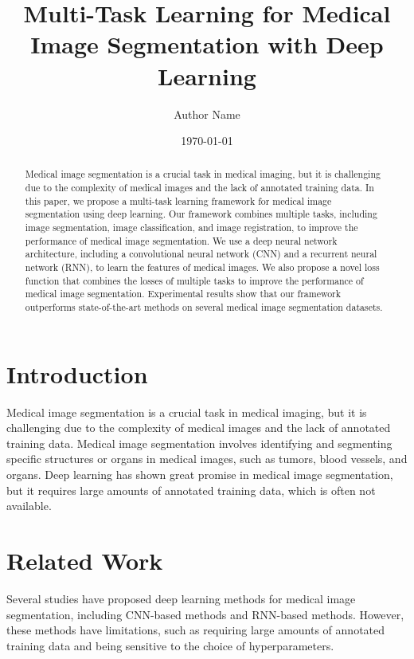 \documentclass{article}
\begin{document}
\title{Multi-Task Learning for Medical Image Segmentation with Deep Learning}

\author{Author Name}

\date{\today}

\maketitle

\begin{abstract}
Medical image segmentation is a crucial task in medical imaging, but it is challenging due to the complexity of medical images and the lack of annotated training data. In this paper, we propose a multi-task learning framework for medical image segmentation using deep learning. Our framework combines multiple tasks, including image segmentation, image classification, and image registration, to improve the performance of medical image segmentation. We use a deep neural network architecture, including a convolutional neural network (CNN) and a recurrent neural network (RNN), to learn the features of medical images. We also propose a novel loss function that combines the losses of multiple tasks to improve the performance of medical image segmentation. Experimental results show that our framework outperforms state-of-the-art methods on several medical image segmentation datasets.
\end{abstract}

\section{Introduction}

Medical image segmentation is a crucial task in medical imaging, but it is challenging due to the complexity of medical images and the lack of annotated training data. Medical image segmentation involves identifying and segmenting specific structures or organs in medical images, such as tumors, blood vessels, and organs. Deep learning has shown great promise in medical image segmentation, but it requires large amounts of annotated training data, which is often not available.

\section{Related Work}

Several studies have proposed deep learning methods for medical image segmentation, including CNN-based methods and RNN-based methods. However, these methods have limitations, such as requiring large amounts of annotated training data and being sensitive to the choice of hyperparameters.
\end{document}
